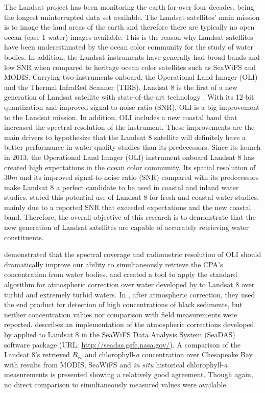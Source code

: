The Landsat project has been monitoring the earth for over four decades, being the longest uninterrupted data set available. The Landsat satellites' main mission is to image the land areas of the earth and therefore there are typically no open ocean (case 1 water) images available. This is the reason why Landsat satellites have been underestimated by the ocean color community for the study of water bodies. In addition, the Landsat instruments have generally had broad bands and low SNR when compared to heritage ocean color satellites such as SeaWiFS and MODIS. Carrying two instruments onboard, the Operational Land Imager (OLI) and the Thermal InfraRed Scanner (TIRS), Landsat 8 is the first of a new generation of Landsat satellite with state-of-the-art technology \cite{Irons:2012}. With its 12-bit quantization and improved signal-to-noise ratio (SNR), OLI is a big improvement to the Landsat mission. In addition, OLI includes a new coastal band that increased the spectral resolution of the instrument. These improvements are the main drivers to hypothesize that the Landsat 8 satellite will definitely have a better performance in water quality studies than its predecessors. Since its launch in 2013, the Operational Land Imager (OLI) instrument onboard Landsat 8 has created high expectations in the ocean color community. Its spatial resolution of $30m$ and its improved signal-to-noise ratio (SNR) compared with its predecessors make Landsat 8 a perfect candidate to be used in coastal and inland water studies. \cite{Roy:2014} stated this potential use of Landsat 8 for fresh and coastal water studies, mainly due to a reported SNR that exceeded expectations and the new coastal band. Therefore, the overall objective of this research is to demonstrate that the new generation of Landsat satellites are capable of accurately retrieving water constituents.

\cite*{Gerace:2013} demonstrated that the spectral coverage and radiometric resolution of OLI should dramatically improve our ability to simultaneously retrieve the CPA's concentration from water bodies. \cite{Vanhellemont2014} and \cite{Vanhellemont:2015} created a tool to apply the standard algorithm for atmospheric correction over water developed by \cite{Gordon:1994} to Landsat 8 over turbid and extremely turbid waters. In \cite{Vanhellemont:2015}, after atmospheric correction, they used the end product for detection of high concentrations of black sediments, but neither concentration values nor comparison with field measurements were reported. \cite{Franz:2015} describes an implementation of the atmospheric corrections developed by \cite{Gordon:1994} applied to Landsat 8 in the SeaWiFS Data Analysis System (SeaDAS) software package (URL: \url{http://seadas.gsfc.nasa.gov/}). A comparison of the Landsat 8's retrieved $R_{rs}$ and chlorophyll-{\it a} concentration over Chesapeake Bay with results from MODIS, SeaWiFS and {\it in situ} historical chlorophyll-{\it a} measurements is presented showing a relatively good agreement. Though again, no direct comparison to simultaneously measured values were available.

